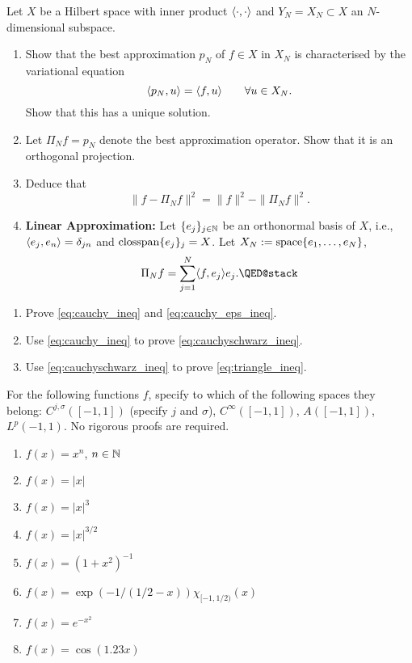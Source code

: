 \begin{exercise}
  \label{exr:prelims:bestapprox_hilbert}
  Let $X$ be a Hilbert space with inner product $\langle\cdot,\cdot\rangle$ and
  $Y_N = X_N \subset X$ an $N$-dimensional subspace.
  \begin{enumerate} \ilist
  \item Show that the best approximation $p_N$ of $f \in X$ in $X_N$ is characterised
    by the variational equation
    \[
         \langle p_N, u \rangle = \langle f, u \rangle \qquad \forall u \in X_N.
    \]
    Show that this has a unique solution.

    \item Let $\Pi_N f = p_N$ denote the best approximation operator. Show
    that it is an orthogonal projection.

    \item Deduce that
    \[
        \| f - \Pi_N f \|^2 = \|f\|^2 - \| \Pi_N f \|^2.
    \]

    \item {\bf Linear Approximation: }  Let $\{ e_j \}_{j \in \mathbb{N}}$ be an
    orthonormal basis of $X$, i.e., $\langle e_j, e_n \rangle = \delta_{jn}$ and ${\rm
    clos}{\rm span}\{e_j\}_j = X$. Let $X_N := {\rm space}\{e_1, \dots, e_N\}$,
    \[
        \Pi_N f = \sum_{j = 1}^N \< f, e_j \> e_j. \qedhere
    \]
  \end{enumerate}
\end{exercise}


\begin{exercise} \label{exr:prelims:inequalities}
  \begin{enumerate} \ilist
  \item Prove \eqref{eq:cauchy_ineq} and
  \eqref{eq:cauchy_eps_ineq}.
  \item Use \eqref{eq:cauchy_ineq} to prove
  \eqref{eq:cauchyschwarz_ineq}.
  \item Use \eqref{eq:cauchyschwarz_ineq} to prove \eqref{eq:triangle_ineq}.
  \qedhere
  \end{enumerate}
\end{exercise}


\begin{exercise}   \label{exr:prelims:functions}
  For the following functions $f$, specify to which of the following
  spaces they belong: $C^{j,\sigma}([-1,1])$ (specify $j$ and $\sigma$),
  $C^\infty([-1,1])$, $A([-1,1])$, $L^p(-1,1)$. No rigorous proofs are
  required.
  \begin{enumerate} \ilist
    \item $f(x) = x^n$, $n \in \mathbb{N}$
    \item $f(x) = |x|$
    \item $f(x) = |x|^{3}$
    \item $f(x) = |x|^{3/2}$
    \item $f(x) = (1+x^2)^{-1}$
    \item $f(x) = \exp( - 1 / (1/2-x) ) \chi_{[-1,1/2)}(x)$
    \item $f(x) = e^{-x^2}$
    \item $f(x) = \cos(1.23 x)$ \qedhere
  \end{enumerate}
\end{exercise}

